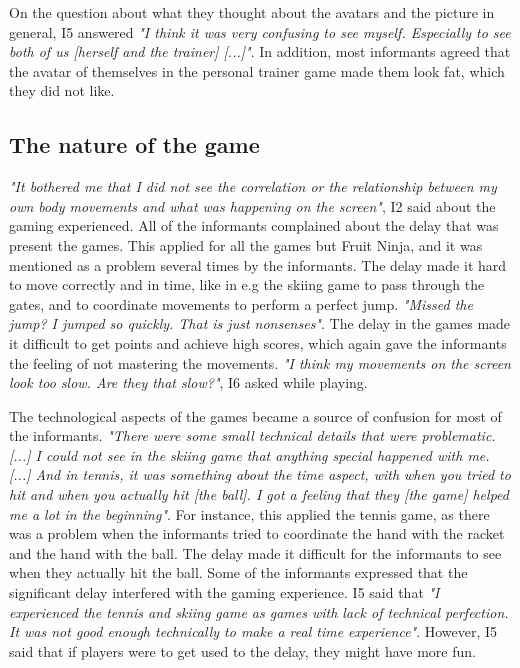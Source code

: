 On the question about what they thought about the avatars and the picture in general, I5 answered \emph{"I think it was very confusing to see myself. Especially to see both of us [herself and the trainer] [...]"}. In addition, most informants agreed that the avatar of themselves in the personal trainer game made them look fat, which they did not like.

\subsection{The nature of the game}

\emph{"It bothered me that I did not see the correlation or the relationship between my own body movements and what was happening on the screen"}, I2 said about the gaming experienced. All of the informants complained about the delay that was present the games. This applied for all the games but Fruit Ninja, and it was mentioned as a problem several times by the informants. The delay made it hard to move correctly and in time, like in e.g the skiing game to pass through the gates, and to coordinate movements to perform a perfect jump. \emph{"Missed the jump? I jumped so quickly. That is just nonsenses"}. The delay in the games made it difficult to get points and achieve high scores, which again gave the informants the feeling of not mastering the movements. \emph{"I think my movements on the screen look too slow. Are they that slow?"}, I6 asked while playing. 

The technological aspects of the games became a source of confusion for most of the informants. \emph{"There were some small technical details that were problematic. [...] I could not see in the skiing game that anything special happened with me. [...] And in tennis, it was something about the time aspect, with when you tried to hit and when you actually hit [the ball]. I got a feeling that they [the game] helped me a lot in the beginning"}. For instance, this applied the tennis game, as there was a problem when the informants tried to coordinate the hand with the racket and the hand with the ball. The delay made it difficult for the informants to see when they actually hit the ball. Some of the informants expressed that the significant delay interfered with the gaming experience. I5 said that \emph{"I experienced the tennis and skiing game as games with lack of technical perfection. It was not good enough technically to make a real time experience"}. However, I5 said that if players were to get used to the delay, they might have more fun.


